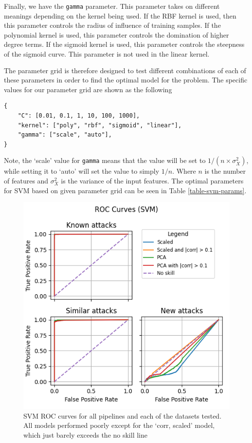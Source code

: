 Finally, we have the \lstinline{gamma} parameter. This parameter takes on different meanings depending on the kernel being used. If the RBF kernel is used, then this parameter controls the radius of influence of training samples. If the polynomial kernel is used, this parameter controls the domination of higher degree terms. If the sigmoid kernel is used, this parameter controls the steepness of the sigmoid curve. This parameter is not used in the linear kernel. \cite{scikit-learn}

The parameter grid is therefore designed to test different combinations of each of these parameters in order to find the optimal model for the problem. The specific values for our parameter grid are shown as the following 
\begin{lstlisting}
{
    "C": [0.01, 0.1, 1, 10, 100, 1000],
    "kernel": ["poly", "rbf", "sigmoid", "linear"],
    "gamma": ["scale", "auto"],
}
\end{lstlisting}
Note, the `scale' value for \lstinline{gamma} means that the value will be set to $1/(n \times \sigma^{2}_{X})$, while setting it to `auto' will set the value to simply $1/n$. Where $n$ is the number of features and $\sigma^{2}_{X}$ is the variance of the input features. The optimal parameters for SVM based on given parameter grid can be seen in Table \ref{table-svm-params}.



\begin{figure}
    \centering
    \includegraphics[width=\linewidth]{figures/SVM_roc_all_small.png}
    \caption{SVM ROC curves for all pipelines and each of the datasets tested. All models performed poorly except for the `corr, scaled' model, which just barely exceeds the no skill line}
    \label{fig:svm-roc}
\end{figure}

